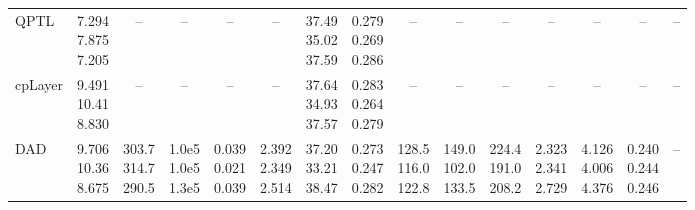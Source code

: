 \begin{landscape}
\begin{table}[t]
{\begin{tabular}{@{}lrrrrrrrrrrrrrr@{}}
QPTL & \makecell[r]{7.294\\7.875\\7.205} & \multicolumn{1}{c}{--} & \multicolumn{1}{c}{--} & \multicolumn{1}{c}{--} & \multicolumn{1}{c}{--} & \makecell[r]{37.49\\35.02\\37.59} & \makecell[r]{0.279\\0.269\\0.286} & \multicolumn{1}{c}{--} & \multicolumn{1}{c}{--} & \multicolumn{1}{c}{--} & \multicolumn{1}{c}{--} & \multicolumn{1}{c}{--} & \multicolumn{1}{c}{--} & \multicolumn{1}{c}{--} \\
cpLayer & \makecell[r]{9.491\\10.41\\8.830} & \multicolumn{1}{c}{--} & \multicolumn{1}{c}{--} & \multicolumn{1}{c}{--} & \multicolumn{1}{c}{--} & \makecell[r]{37.64\\34.93\\37.57} & \makecell[r]{0.283\\0.264\\0.279} & \multicolumn{1}{c}{--} & \multicolumn{1}{c}{--} & \multicolumn{1}{c}{--} & \multicolumn{1}{c}{--} & \multicolumn{1}{c}{--} & \multicolumn{1}{c}{--} & \multicolumn{1}{c}{--} \\
DAD & \makecell[r]{9.706\\10.36\\8.675} & \makecell[r]{303.7\\314.7\\290.5} & \makecell[r]{1.0e5\\1.0e5\\1.3e5} & \makecell[r]{0.039\\0.021\\0.039} & \makecell[r]{2.392\\2.349\\2.514} & \makecell[r]{37.20\\33.21\\38.47} & \makecell[r]{0.273\\0.247\\0.282} & \makecell[r]{128.5\\116.0\\122.8} & \makecell[r]{149.0\\102.0\\133.5} & \makecell[r]{224.4\\191.0\\208.2} & \makecell[r]{2.323\\2.341\\2.729} & \makecell[r]{4.126\\4.006\\4.376} & \makecell[r]{0.240\\0.244\\0.246} & \multicolumn{1}{c}{--} \\
\bottomrule
\end{tabular}%
}
\end{table}
\end{landscape}
